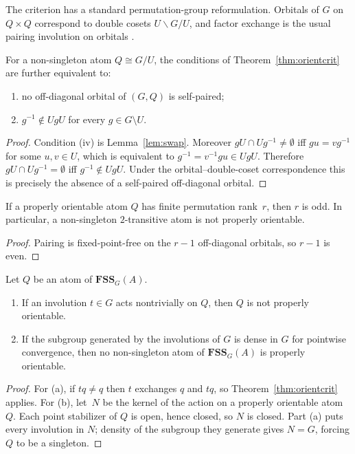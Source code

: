 \documentclass{lmcs}
\newcommand{\FSS}{\mathbf{FSS}}
\begin{document}
The criterion has a standard permutation-group reformulation. Orbitals of
$G$ on $Q\times Q$ correspond to double cosets $U\backslash G/U$, and
factor exchange is the usual pairing involution on orbitals
\cite[Sec.~1.11]{Cameron99}.

\begin{thm}\label{thm:doublecoset}
For a non-singleton atom $Q\cong G/U$, the conditions of
Theorem~\ref{thm:orientcrit} are further equivalent to:
\begin{enumerate}[label=\textup{(\roman*)},start=4]
\item no off-diagonal orbital of $(G,Q)$ is self-paired;
\item $g^{-1}\notin UgU$ for every $g\in G\setminus U$.
\end{enumerate}
\end{thm}
\begin{proof}
Condition (iv) is Lemma~\ref{lem:swap}. Moreover
$gU\cap Ug^{-1}\neq\emptyset$ iff $gu=vg^{-1}$ for some $u,v\in U$,
which is equivalent to $g^{-1}=v^{-1}gu\in UgU$. Therefore
$gU\cap Ug^{-1}=\emptyset$ iff $g^{-1}\notin UgU$. Under the
orbital--double-coset correspondence this is precisely the absence of a
self-paired off-diagonal orbital.
\end{proof}

\begin{cor}\label{cor:rankodd}
If a properly orientable atom $Q$ has finite permutation rank~$r$, then
$r$ is odd. In particular, a non-singleton $2$-transitive atom is not
properly orientable.
\end{cor}
\begin{proof}
Pairing is fixed-point-free on the $r-1$ off-diagonal orbitals, so
$r-1$ is even.
\end{proof}

\begin{thm}\label{thm:involution}
Let $Q$ be an atom of $\FSS_G(A)$.
\begin{enumerate}[label=\textup{(\alph*)}]
\item If an involution $t\in G$ acts nontrivially on $Q$, then $Q$ is
not properly orientable.
\item If the subgroup generated by the involutions of $G$ is dense in
$G$ for pointwise convergence, then no non-singleton atom of
$\FSS_G(A)$ is properly orientable.
\end{enumerate}
\end{thm}
\begin{proof}
For (a), if $tq\neq q$ then $t$ exchanges $q$ and $tq$, so
Theorem~\ref{thm:orientcrit} applies. For (b), let~$N$ be the kernel of
the action on a properly orientable atom $Q$. Each point stabilizer of
$Q$ is open, hence closed, so $N$ is closed. Part (a) puts every
involution in $N$; density of the subgroup they generate gives $N=G$,
forcing $Q$ to be a singleton.
\end{proof}
\end{document}
